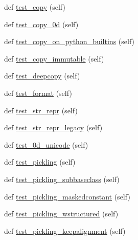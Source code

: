 \begin{DoxyCompactItemize}
\item 
def \hyperlink{classnumpy_1_1ma_1_1tests_1_1test__core_1_1TestMaskedArray_aa09cbc12253b33bc92c882f3c63ec0a4}{test\+\_\+copy} (self)
\item 
def \hyperlink{classnumpy_1_1ma_1_1tests_1_1test__core_1_1TestMaskedArray_ae88a579809d64dbfb0abd28e53de34da}{test\+\_\+copy\+\_\+0d} (self)
\item 
def \hyperlink{classnumpy_1_1ma_1_1tests_1_1test__core_1_1TestMaskedArray_af93c1f6a281542edbaf2ea0963ba28b0}{test\+\_\+copy\+\_\+on\+\_\+python\+\_\+builtins} (self)
\item 
def \hyperlink{classnumpy_1_1ma_1_1tests_1_1test__core_1_1TestMaskedArray_aaf1046801209651be5cd55f94c8eef56}{test\+\_\+copy\+\_\+immutable} (self)
\item 
def \hyperlink{classnumpy_1_1ma_1_1tests_1_1test__core_1_1TestMaskedArray_a144f65c3d47830cf7cb3abe2b6106afe}{test\+\_\+deepcopy} (self)
\item 
def \hyperlink{classnumpy_1_1ma_1_1tests_1_1test__core_1_1TestMaskedArray_acb3269d73c29e91be41ae6517a55cc6d}{test\+\_\+format} (self)
\item 
def \hyperlink{classnumpy_1_1ma_1_1tests_1_1test__core_1_1TestMaskedArray_aaf84c3047414157ea98a58e230462d87}{test\+\_\+str\+\_\+repr} (self)
\item 
def \hyperlink{classnumpy_1_1ma_1_1tests_1_1test__core_1_1TestMaskedArray_a2a883030982243a73d5b5b4f1e11b096}{test\+\_\+str\+\_\+repr\+\_\+legacy} (self)
\item 
def \hyperlink{classnumpy_1_1ma_1_1tests_1_1test__core_1_1TestMaskedArray_aaa6be18939bf740225c7e24a1fe700b7}{test\+\_\+0d\+\_\+unicode} (self)
\item 
def \hyperlink{classnumpy_1_1ma_1_1tests_1_1test__core_1_1TestMaskedArray_a84444d6941b28b44a9fb30bdeac8dd35}{test\+\_\+pickling} (self)
\item 
def \hyperlink{classnumpy_1_1ma_1_1tests_1_1test__core_1_1TestMaskedArray_a81836f6996dd9f4f2402e2f0e7eada12}{test\+\_\+pickling\+\_\+subbaseclass} (self)
\item 
def \hyperlink{classnumpy_1_1ma_1_1tests_1_1test__core_1_1TestMaskedArray_af2003820fc26c299863de8bcd3a6a270}{test\+\_\+pickling\+\_\+maskedconstant} (self)
\item 
def \hyperlink{classnumpy_1_1ma_1_1tests_1_1test__core_1_1TestMaskedArray_a99819e8ffafd9771095cdcedb2aecdbd}{test\+\_\+pickling\+\_\+wstructured} (self)
\item 
def \hyperlink{classnumpy_1_1ma_1_1tests_1_1test__core_1_1TestMaskedArray_a557ab4d4d934d07bc71443696b335640}{test\+\_\+pickling\+\_\+keepalignment} (self)

\end{DoxyCompactItemize}

